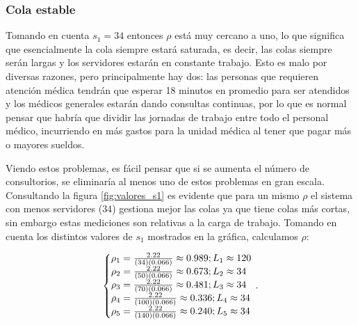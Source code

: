 \documentclass[10pt]{article}
\begin{document}
    \subsubsection{Cola estable}
    Tomando en cuenta $s_{1} = 34$ entonces $\rho$ está muy cercano a uno, lo que significa que esencialmente la cola siempre estará saturada, es decir, las colas siempre serán largas y los servidores estarán en constante trabajo. Esto es malo por diversas razones, pero principalmente hay dos: las personas que requieren atención médica tendrán que esperar 18 minutos en promedio para ser atendidos y los médicos generales estarán dando consultas continuas, por lo que es normal pensar que habría que dividir las jornadas de trabajo entre todo el personal médico, incurriendo en más gastos para la unidad médica al tener que pagar más o mayores sueldos. 
    
    Viendo estos problemas, es fácil pensar que si se aumenta el número de consultorios, se eliminaría al menos uno de estos problemas en gran escala. Consultando la figura \ref{fig:valores_s1} es evidente que para un mismo $\rho$ el sistema con menos servidores ($34$) gestiona mejor las colas ya que tiene colas más cortas, sin embargo estas mediciones son relativas a la carga de trabajo. Tomando en cuenta los distintos valores de $s_{1}$ mostrados en la gráfica, calculamos $\rho$:
    
    \begin{equation*}
    	\left\{
    	\begin{array}{@{}l@{}}
    		\rho_{1} = \frac{2.22}{(34)(0.066)} \approx 0.989 ; L_{1} \approx 120 \\
    		\rho_{2} = \frac{2.22}{(50)(0.066)} \approx 0.673 ; L_{2} \approx 34 \\
    		\rho_{3} = \frac{2.22}{(70)(0.066)} \approx 0.481 ; L_{3} \approx 34 \\
    		\rho_{4} = \frac{2.22}{(100)(0.066)} \approx 0.336 ; L_{4} \approx 34 \\
    		\rho_{5} = \frac{2.22}{(140)(0.066)} \approx 0.240 ; L_{5} \approx 34 \\
    	\end{array}
    	\right.\,.
    \end{equation*}
    
\end{document}
